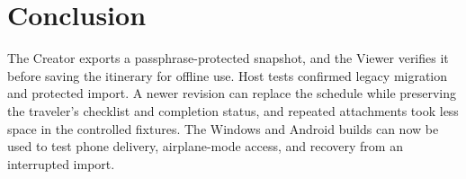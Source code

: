 \section{Conclusion}
The Creator exports a passphrase-protected snapshot, and the Viewer verifies it before saving the itinerary for offline use. Host tests confirmed legacy migration and protected import. A newer revision can replace the schedule while preserving the traveler's checklist and completion status, and repeated attachments took less space in the controlled fixtures. The Windows and Android builds can now be used to test phone delivery, airplane-mode access, and recovery from an interrupted import.

